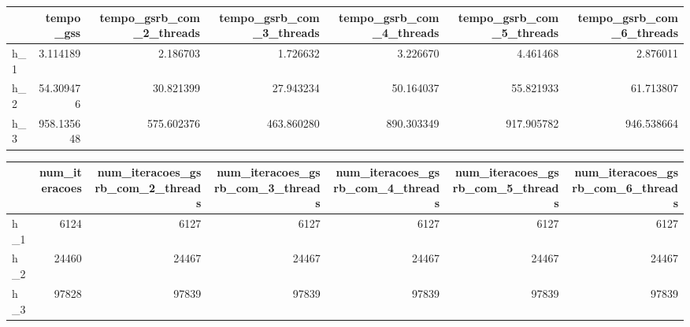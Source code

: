 \begin{tabular}{lrrrrrr}
\toprule
 & tempo_gss & tempo_gsrb_com_2_threads & tempo_gsrb_com_3_threads & tempo_gsrb_com_4_threads & tempo_gsrb_com_5_threads & tempo_gsrb_com_6_threads \\
\midrule
h_1 & 3.114189 & 2.186703 & 1.726632 & 3.226670 & 4.461468 & 2.876011 \\
h_2 & 54.309476 & 30.821399 & 27.943234 & 50.164037 & 55.821933 & 61.713807 \\
h_3 & 958.135648 & 575.602376 & 463.860280 & 890.303349 & 917.905782 & 946.538664 \\
\bottomrule
\end{tabular}

\begin{tabular}{lrrrrrr}
\toprule
 & num_iteracoes & num_iteracoes_gsrb_com_2_threads & num_iteracoes_gsrb_com_3_threads & num_iteracoes_gsrb_com_4_threads & num_iteracoes_gsrb_com_5_threads & num_iteracoes_gsrb_com_6_threads \\
\midrule
h_1 & 6124 & 6127 & 6127 & 6127 & 6127 & 6127 \\
h_2 & 24460 & 24467 & 24467 & 24467 & 24467 & 24467 \\
h_3 & 97828 & 97839 & 97839 & 97839 & 97839 & 97839 \\
\bottomrule
\end{tabular}
